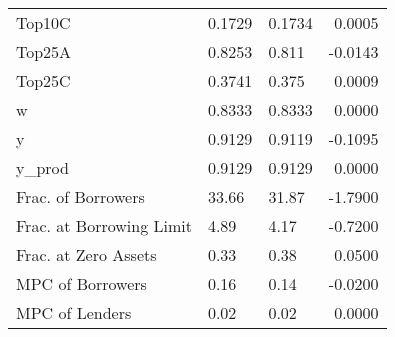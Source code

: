 \begin{table}
\begin{tabular}{lllr}
                  Top10C &  0.1729 &   0.1734 &   0.0005 \\
                  Top25A &  0.8253 &    0.811 &  -0.0143 \\
                  Top25C &  0.3741 &    0.375 &   0.0009 \\
                       w &  0.8333 &   0.8333 &   0.0000 \\
                       y &  0.9129 &   0.9119 &  -0.1095 \\
                  y\_prod &  0.9129 &   0.9129 &   0.0000 \\
      Frac. of Borrowers &   33.66 &    31.87 &  -1.7900 \\
Frac. at Borrowing Limit &    4.89 &     4.17 &  -0.7200 \\
    Frac. at Zero Assets &    0.33 &     0.38 &   0.0500 \\
        MPC of Borrowers &    0.16 &     0.14 &  -0.0200 \\
          MPC of Lenders &    0.02 &     0.02 &   0.0000 \\
\bottomrule
\end{tabular}
\end{table}
